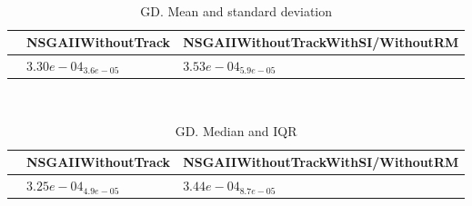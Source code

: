 \documentclass{article}
\begin{document}
\
\begin{table}
\caption{GD. Mean and standard deviation}
\label{table:mean.GD}
\centering
\begin{scriptsize}
\begin{tabular}{lll}
\hline & NSGAIIWithoutTrack &  NSGAIIWithoutTrackWithSI/WithoutRM\\
\hline
 & \cellcolor{gray95}$  3.30e-04_{ 3.6e-05}$ & \cellcolor{gray25}$  3.53e-04_{ 5.9e-05}$ \\
\hline
\end{tabular}
\end{scriptsize}
\end{table}
\
\begin{table}
\caption{GD. Median and IQR}
\label{table:median.GD}
\begin{scriptsize}
\centering
\begin{tabular}{lll}
\hline & NSGAIIWithoutTrack &  NSGAIIWithoutTrackWithSI/WithoutRM\\
\hline
 & \cellcolor{gray95}$  3.25e-04_{ 4.9e-05}$ & \cellcolor{gray25}$  3.44e-04_{ 8.7e-05}$ \\
\hline
\end{tabular}
\end{scriptsize}
\end{table}
\end{document}
